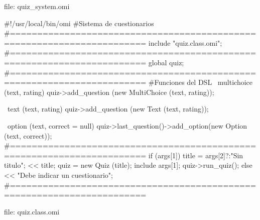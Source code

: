 file: quiz\_system.omi
\begin{myverbatim}
#!/usr/local/bin/omi
#Sistema de cuestionarios
#=======================================================================
include "quiz.class.omi";
#=======================================================================
global quiz;
#=======================================================================
#Funciones del DSL 
~multichoice (text, rating) {
   quiz->add_question (new MultiChoice (text, rating));
}

~text (text, rating) {
   quiz->add_question (new Text (text, rating));
}

~option (text, correct = null) {
   quiz->last_question()->add_option(new Option (text, correct));
}
#=======================================================================
if (args[1]){
   title = args[2]?:"Sin titulo";
   << title;
   quiz =  new Quiz (title);
   include args[1];
   quiz->run_quiz();
}
else
   << "Debe indicar un cuestionario";
#=======================================================================
\end{myverbatim}
\pagebreak
file: quiz.class.omi

